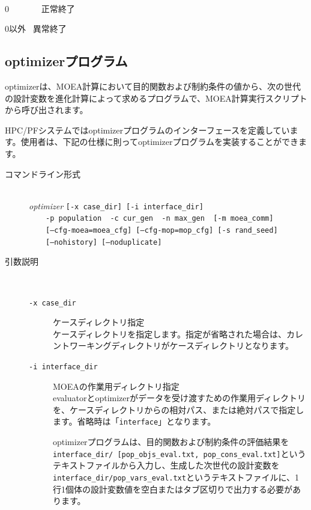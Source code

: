\documentclass[a4paper,11pt]{jarticle}
\begin{document}
{\begin{description}
\begin{description}
\end{description}


\item[戻り値(終了ステータス)] {\ }\\
0 \ \ \ \ \ \ \ 正常終了

0以外 \ 異常終了
\end{description}


\newpage
\subsection{optimizerプログラム}

optimizerは、MOEA計算において目的関数および制約条件の値から、次の世代の設計変数を進化計算によって求めるプログラムで、MOEA計算実行スクリプトから呼び出されます。

HPC/PFシステムではoptimizerプログラムのインターフェースを定義しています。使用者は、下記の仕様に則ってoptimizerプログラムを実装することができます。

\begin{description}
\item[コマンドライン形式] {\ }\\
\textit{optimizer} {\tt [-x case\_dir] [-i interface\_dir]}\\
\ \ \ \ {\tt -p population \ -c cur\_gen \ -n max\_gen \ [-m moea\_comm]}\\
\ \ \ \ {\tt [--cfg-moea=moea\_cfg] [--cfg-mop=mop\_cfg] [-s rand\_seed]}\\
\ \ \ \ {\tt [--nohistory] [--noduplicate]}


\item[引数説明] {\ }\par
\begin{description}
\item[{\tt -x  case\_dir}] ケースディレクトリ指定\\
ケースディレクトリを指定します。指定が省略された場合は、カレントワーキングディレクトリがケースディレクトリとなります。\\

\item[{\tt -i  interface\_dir}] MOEAの作業用ディレクトリ指定\\
evaluatorとoptimizerがデータを受け渡すための作業用ディレクトリを、ケースディレクトリからの相対パス、または絶対パスで指定します。省略時は「{\tt interface}」となります。

optimizerプログラムは、目的関数および制約条件の評価結果を{\tt interface\_dir/ [pop\_objs\_eval.txt, pop\_cons\_eval.txt]}というテキストファイルから入力し、生成した次世代の設計変数を{\tt interface\_dir/pop\_vars\_eval.txt}というテキストファイルに、1行1個体の設計変数値を空白またはタブ区切りで出力する必要があります。\\


\end{description}
\end{description}}
\end{document}
